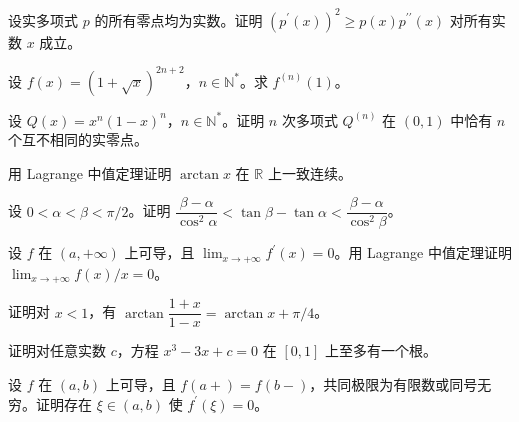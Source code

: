 \newpage
\noindent\begin{minipage}{\textwidth}
设实多项式 $p$ 的所有零点均为实数。证明 $(p^{\prime}(x))^2\ge p(x)p^{\prime\prime}(x)$ 对所有实数 $x$ 成立。
\end{minipage}\par\vfill
\noindent\begin{minipage}{\textwidth}
设 $f(x)=(1+\sqrt{x})^{2n+2}$，$n\in\mathbb N^*$。求 $f^{(n)}(1)$。
\end{minipage}\par\vfill
\noindent\begin{minipage}{\textwidth}
设 $Q(x)=x^n(1-x)^n$，$n\in\mathbb N^*$。证明 $n$ 次多项式 $Q^{(n)}$ 在 $(0,1)$ 中恰有 $n$ 个互不相同的实零点。
\end{minipage}\par\vfill
\newpage
\noindent\begin{minipage}{\textwidth}
用 Lagrange 中值定理证明 $\arctan x$ 在 $\mathbb R$ 上一致连续。
\end{minipage}\par\vfill
\noindent\begin{minipage}{\textwidth}
设 $0<\alpha<\beta<\pi/2$。证明 $\dfrac{\beta-\alpha}{\cos^2\alpha}<\tan\beta-\tan\alpha<\dfrac{\beta-\alpha}{\cos^2\beta}$。
\end{minipage}\par\vfill
\noindent\begin{minipage}{\textwidth}
设 $f$ 在 $(a,+\infty)$ 上可导，且 $\lim_{x\to+\infty}f^{\prime}(x)=0$。用 Lagrange 中值定理证明 $\lim_{x\to+\infty}f(x)/x=0$。
\end{minipage}\par\vfill
\newpage
\noindent\begin{minipage}{\textwidth}
证明对 $x<1$，有 $\arctan\dfrac{1+x}{1-x}=\arctan x+\pi/4$。
\end{minipage}\par\vfill
\noindent\begin{minipage}{\textwidth}
证明对任意实数 $c$，方程 $x^3-3x+c=0$ 在 $[0,1]$ 上至多有一个根。
\end{minipage}\par\vfill
\noindent\begin{minipage}{\textwidth}
设 $f$ 在 $(a,b)$ 上可导，且 $f(a+)=f(b-)$，共同极限为有限数或同号无穷。证明存在 $\xi\in(a,b)$ 使 $f^{\prime}(\xi)=0$。
\end{minipage}\par\vfill
